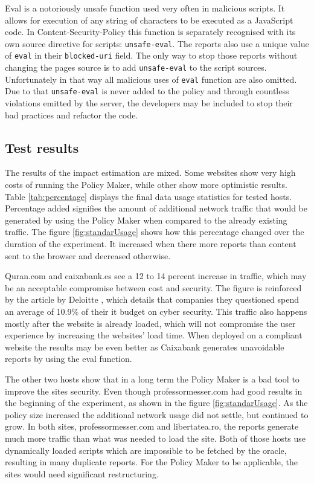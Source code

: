 Eval is a notoriously unsafe function used very often in malicious scripts. 
It allows for execution of any string of characters to be executed as a JavaScript code. 
In Content-Security-Policy this function is separately recognised with its own source directive for scripts: \texttt{unsafe-eval}.
The reports also use a unique value of \texttt{eval} in their \texttt{blocked-uri} field.
The only way to stop those reports without changing the pages source is to add \texttt{unsafe-eval} to the script sources.
Unfortunately in that way all malicious uses of \texttt{eval} function are also omitted.
Due to that \texttt{unsafe-eval} is never added to the policy and through countless violations emitted by the server, the developers may be included to stop their bad practices and refactor the code.

\subsection{Test results}

The results of the impact estimation are mixed. 
Some websites show very high costs of running the Policy Maker, while other show more optimistic results.
Table \ref{tab:percentage} displays the final data usage statistics for tested hosts.
Percentage added signifies the amount of additional network traffic that would be generated by using the Policy Maker when compared to the already existing traffic.
The figure \ref{fig:standarUsage} shows how this percentage changed over the duration of the experiment.
It increased when there more reports than content sent to the browser and decreased otherwise.

Quran.com and caixabank.es see a 12 to 14 percent increase in traffic, which may be an acceptable compromise between cost and security.
The figure is reinforced by the article by Deloitte \cite{secSpend}, which details that companies they questioned spend an average of 10.9\% of their it budget on cyber security.
This traffic also happens mostly after the website is already loaded, which will not compromise the user experience by increasing the websites' load time.
When deployed on a compliant website the results may be even better as Caixabank generates unavoidable reports by using the eval function.


The other two hosts show that in a long term the Policy Maker is a bad tool to improve the sites security.
Even though professormesser.com had good results in the beginning of the experiment, as shown in the figure \ref{fig:standarUsage}.
As the policy size increased the additional network usage did not settle, but continued to grow.
In both sites, professormesser.com and libertatea.ro, the reports generate much more traffic than what was needed to load the site.
Both of those hosts use dynamically loaded scripts which are impossible to be fetched by the oracle, resulting in many duplicate reports.
For the Policy Maker to be applicable, the sites would need significant restructuring.

